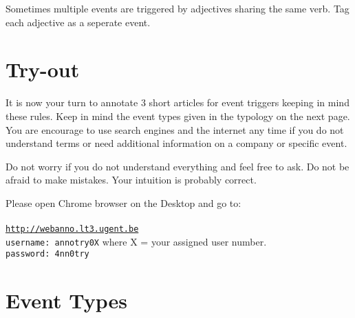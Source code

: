 \documentclass[a4paper]{report}
\begin{document}
\begin{exe}
    \ex {}
    \ex {}
\end{exe}

Sometimes multiple events are triggered by adjectives sharing the same verb. Tag each adjective as a seperate event.

\section{Try-out}

It is now your turn to annotate 3 short articles for event triggers keeping in mind these rules.
Keep in mind the event types given in the typology on the next page.
You are encourage to use search engines and the internet any time if you do not understand terms or need additional information on a company or specific event.

Do not worry if you do not understand everything and feel free to ask.
Do not be afraid to make mistakes.
Your intuition is probably correct.

Please open Chrome browser on the Desktop and go to: \\\\
\large{\texttt{\url{http://webanno.lt3.ugent.be}}} \\
\large{\texttt{username: annotry0X}} where X = your assigned user number.\\
\large{\texttt{password: 4nn0try}}

\newpage
\section{Event Types}
\end{document}
